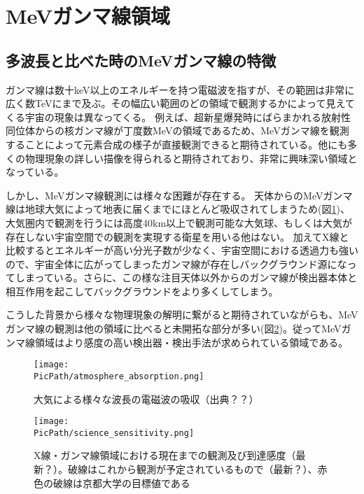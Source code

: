 \def\PicPath{/Users/ken/Documents/shuron/chapter1/1_1}

\begin{comment}
ガンマ線ってこういうの　MeVガンマ線はこういうエネルギーを持ったガンマ線
MeVガンマ線は例えば、こういうものから出ている、見えてくる
MeVガンマ線の特徴…大気に吸収されやすい、バックグラウンドが多い、観測装置を作るのが難しい
その結果他の領域に比べて遅れている
\end{comment}

\section{MeVガンマ線領域}
\subsection{多波長と比べた時のMeVガンマ線の特徴}
ガンマ線は数十keV以上のエネルギーを持つ電磁波を指すが、その範囲は非常に広く数TeVにまで及ぶ。その幅広い範囲のどの領域で観測するかによって見えてくる宇宙の現象は異なってくる。
例えば、超新星爆発時にばらまかれる放射性同位体からの核ガンマ線が丁度数MeVの領域であるため、MeVガンマ線を観測することによって元素合成の様子が直接観測できると期待されている。他にも多くの物理現象の詳しい描像を得られると期待されており、非常に興味深い領域となっている。

しかし、MeVガンマ線観測には様々な困難が存在する。
天体からのMeVガンマ線は地球大気によって地表に届くまでにほとんど吸収されてしまうため(図\ref{fig:atm_absp})、大気圏内で観測を行うには高度40km以上で観測可能な大気球、もしくは大気が存在しない宇宙空間での観測を実現する衛星を用いる他はない。
加えてX線と比較するとエネルギーが高い分光子数が少なく、宇宙空間における透過力も強いので、宇宙全体に広がってしまったガンマ線が存在しバックグラウンド源になってしまっている。さらに、この様な注目天体以外からのガンマ線が検出器本体と相互作用を起こしてバックグラウンドをより多くしてしまう。

こうした背景から様々な物理現象の解明に繋がると期待されていながらも、MeVガンマ線の観測は他の領域に比べると未開拓な部分が多い(図\ref{fig:science_sensitivity})。従ってMeVガンマ線領域はより感度の高い検出器・検出手法が求められている領域である。

\begin{figure}
\centering
\texttt{[image: \\PicPath/atmosphere\_absorption.png]}
\caption{大気による様々な波長の電磁波の吸収（出典？？）\cite{oda_and_matsuoka}}
\label{fig:atm_absp}
\end{figure}

\begin{figure}
\centering
\texttt{[image: \\PicPath/science\_sensitivity.png]}
\caption{X線・ガンマ線領域における現在までの観測及び到達感度（最新？）。破線はこれから観測が予定されているもので（最新？）、赤色の破線は京都大学の目標値である}
\label{fig:science_sensitivity}
\end{figure}

\clearpage